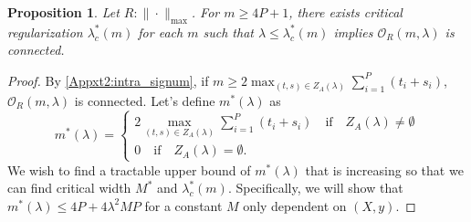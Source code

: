 \documentclass{article}
\newtheorem{proposition}{Proposition}[section]
\begin{document}
\begin{proposition}
\label{AppxProp8:Signum_reg}
Let $R: \|\cdot\|_{\max}$. For $m \geq 4P+1$, there exists critical regularization $\lambda_c^*(m)$ for each $m$ such that $\lambda \leq \lambda_c^{*}(m)$ implies $\mathcal{O}_R(m, \lambda)$ is connected.
\end{proposition}
\begin{proof} 
By \cref{Appxt2:intra_signum}, if $m \geq 2 \max_{(t,s) \in Z_A(\lambda)} \sum_{i=1}^P (t_i+s_i)$, $\mathcal{O}_R(m, \lambda)$ is connected. Let's define $m^{*}(\lambda)$ as
\[
m^{*}(\lambda) = \begin{cases}
2 \max_{(t,s) \in Z_A(\lambda)} \sum_{i=1}^P (t_i+s_i) \quad \textrm{if} \quad Z_A(\lambda) \neq \emptyset \\[4pt]
0 \quad \textrm{if} \quad Z_A(\lambda) = \emptyset.
\end{cases}
\]
We wish to find a tractable upper bound of $m^{*}(\lambda)$ that is increasing so that we can find critical width $M^{*}$ and $\lambda^{*}_c(m)$. Specifically, we will show that $m^{*}(\lambda) \leq 4P + 4\lambda^2 M P$ for a constant $M$ only dependent on $(X, y)$. 


\end{proof}
\end{document}
